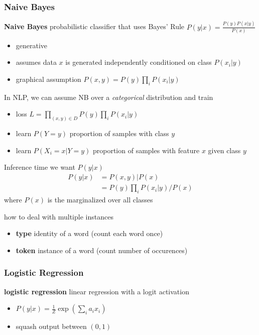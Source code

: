 \documentclass[]{article}
\theoremstyle{definition}
\begin{document}
\subsubsection{Naive Bayes}%
\label{ssub:naive_bayes}

\textbf{Naive Bayes} probabilistic classifier that uses Bayes' Rule $P(y|x) = \frac{P(y)P(x|y)}{P(x)}$
\begin{itemize}
    \item generative
    \item assumes data $x$ is generated independently conditioned on class $P(x_i | y)$
    \item graphical assumption $P(x,y) = P(y) \prod_i P(x_i|y)$
\end{itemize}

In NLP, we can assume NB over a \textit{categorical} distribution and train
\begin{itemize}
    \item loss $L = \prod_{(x,y) \in D} P(y) \prod_i P(x_i|y)$
    \item learn $P(Y=y)$ proportion of samples with class $y$
    \item learn $P(X_i = x| Y= y)$ proportion of samples with feature $x$ given class $y$
\end{itemize}

Inference time we want $P(y|x)$
\begin{align}
    P(y|x) &= P(x,y) | P(x) \\
           &= P(y) \prod_i P(x_i|y) / P(x)
\end{align}
where $P(x)$ is the marginalized over all classes

how to deal with multiple instances
\begin{itemize}
    \item \textbf{type} identity of a word (count each word once)
    \item \textbf{token} instance of a word (count number of occurences)
\end{itemize}

\subsubsection{Logistic Regression}%
\label{ssub:logistic_regression}

\textbf{logistic regression} linear regression with a logit activation
\begin{itemize}
    \item $P(y|x) = \frac{1}{Z} \exp (\sum_i a_i x_i)$
    \item squash output between $(0,1)$
\end{itemize}
\end{document}
